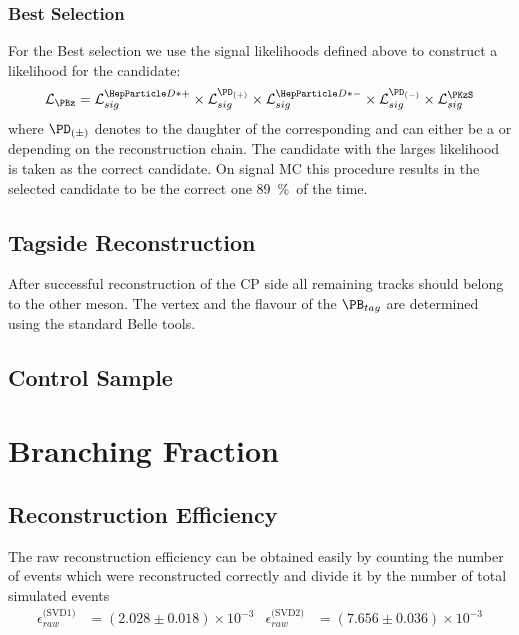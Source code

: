 \documentclass[a4paper]{report}
\def\BestBSelectionEff{\SI{89}{\%}}
\def\RawReconstructionEffSVDOne{(2.028 \pm 0.018) \times 10^{-3}}
\def\RawReconstructionEffSVDTwo{(7.656 \pm 0.036) \times 10^{-3}}
\begin{document}

\subsection{Best \texorpdfstring{\PB}{B} Selection}
\label{sec:bestB}
For the Best \PB selection we use the signal likelihoods defined above to
construct a likelihood for the \PB candidate:
\[
\LH_{\PBz} = \LH_{sig}^{\PDstp} \times \LH_{sig}^{\PD_{(+)}} \times \LH_{sig}^{\PDstm} \times
\LH_{sig}^{\PD_{(-)}} \times \LH_{sig}^{\PKzS}
\]
where $\PD_{(\pm)}$ denotes to the daughter \PD of the corresponding \PDstpm and
can either be a \PDz or \PDpm depending on the reconstruction chain. The \PB
candidate with the larges likelihood is taken as the correct \PB candidate. On
signal MC this procedure results in the selected \PB candidate to be the correct
one \BestBSelectionEff\ of the time.


\section{Tagside Reconstruction}

After successful reconstruction of the CP side all remaining tracks should
belong to the other \PB meson. The vertex and the flavour of the $\PB_{tag}$ are
determined using the standard Belle tools.

\section{Control Sample}

\chapter{Branching Fraction}

\section{Reconstruction Efficiency}

The raw reconstruction efficiency can be obtained easily by counting the number
of events which were reconstructed correctly and divide it by the number of
total simulated events
\begin{align}
    \epsilon_{raw}^{\text{(SVD1)}} & = \RawReconstructionEffSVDOne &
    \epsilon_{raw}^{\text{(SVD2)}} & = \RawReconstructionEffSVDTwo
\end{align}
\end{document}
